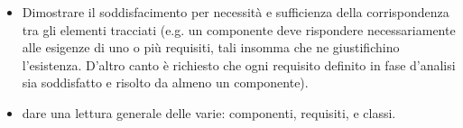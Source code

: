 \begin{itemize}
	\item Dimostrare il soddisfacimento per necessità e sufficienza della corrispondenza tra gli elementi tracciati (e.g. un componente deve rispondere necessariamente alle esigenze di uno o più requisiti, tali insomma che ne giustifichino l'esistenza. D'altro canto è richiesto che ogni requisito definito in fase d'analisi sia soddisfatto e risolto da almeno un componente).
	\item dare una lettura generale delle varie: componenti, requisiti,  e classi.
\end{itemize}




